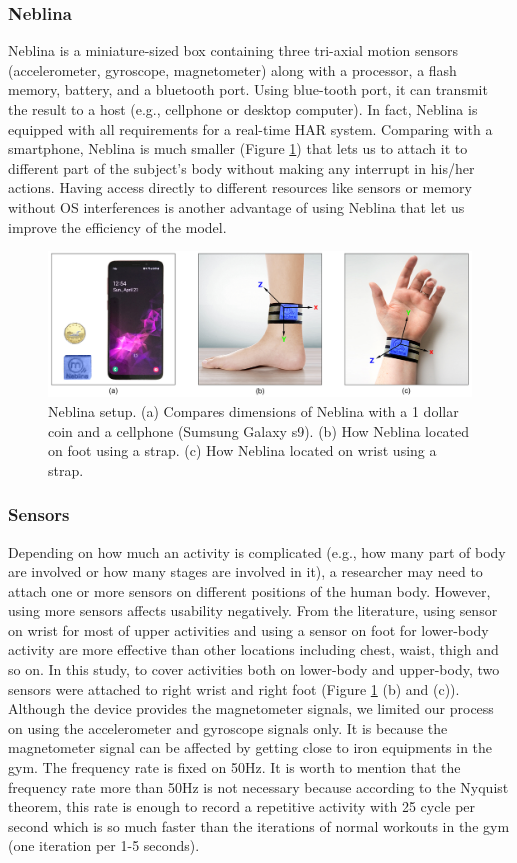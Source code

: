 \documentclass[journal,article,submit,moreauthors,pdftex]{Definitions/mdpi}
\begin{document}
\subsubsection{Neblina}
Neblina is a miniature-sized box containing three tri-axial motion sensors (accelerometer, gyroscope, magnetometer) along with a processor, a flash memory, battery, and a bluetooth port. Using blue-tooth port, it can transmit the result to a host (e.g., cellphone or desktop computer).  In fact, Neblina is equipped with all requirements for a real-time HAR system. Comparing with a smartphone, Neblina is much smaller (Figure \ref{neblina_setup}) that lets us to attach it to different part of the subject's body without making any interrupt in his/her actions\cite{de2018comparative}. Having access directly to different resources like sensors or memory without OS interferences is another advantage of using Neblina that let us improve the efficiency of the model.
\begin{figure}[H]
	\centering
	\includegraphics[width=10 cm]{Definitions/images/neblina_setup.jpg}
	\caption{Neblina setup. (a) Compares dimensions of Neblina with a 1 dollar coin and a cellphone (Sumsung Galaxy s9). (b) How Neblina located on foot using a strap. (c) How Neblina located on wrist using a strap.}
	\label{neblina_setup}
\end{figure} 
\subsubsection{Sensors} 
Depending on how much an activity is complicated (e.g., how many part of body are involved or how many stages are involved in it), a researcher may need to attach one or more sensors on different positions of the human body. However, using more sensors affects usability negatively. From the literature, using sensor on wrist for most of upper activities and using a sensor on foot for lower-body activity are more effective than other locations including chest, waist, thigh and so on. In this study, to cover activities both on lower-body and upper-body, two sensors were attached to right wrist and right foot (Figure \ref{neblina_setup} (b) and (c)). Although the device provides the magnetometer signals, we limited our process on using the accelerometer and gyroscope signals only. It is because the magnetometer signal can be affected by getting close to iron equipments in the gym. The frequency rate is fixed on 50Hz. It is worth to mention that the frequency rate more than 50Hz is not necessary because according to the Nyquist theorem, this rate is enough to record a repetitive activity with 25 cycle per second which is so much faster than the iterations of normal workouts in the gym (one iteration per 1-5 seconds).\\
\end{document}
